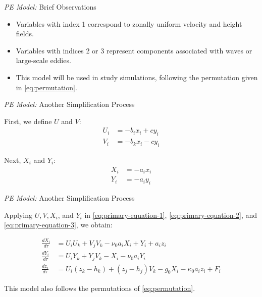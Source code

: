 
\begin{frame}{\textit{PE Model:} Brief Observations}
	
	\begin{itemize}
		\item Variables with index 1 correspond to zonally uniform velocity and height fields.
		      
		\item Variables with indices 2 or 3 represent components associated with waves or large-scale eddies.
		      
		\item This model will be used in study simulations, following the permutation given in \eqref{eq:permutation}.
	\end{itemize}
	
\end{frame}


\begin{frame}{\textit{PE Model:} Another Simplification Process}
	
	First, we define $U$ and $V$:
	\begin{align}
		U_i & = -b_ix_i + cy_i \\
		V_i & = -b_kx_i - cy_i 
	\end{align}
	
	Next, $X_i$ and $Y_i$:
	\begin{align}
		X_i & = -a_ix_i \\
		Y_i & = -a_iy_i 
	\end{align}
	
\end{frame}


\begin{frame}{\textit{PE Model:} Another Simplification Process}
	
	Applying $U, V, X_i$, and $Y_i$ in \eqref{eq:primary-equation-1}, \eqref{eq:primary-equation-2}, and \eqref{eq:primary-equation-3}, we obtain:
	
	\begin{align}
		\frac{dX_i}{d\tau} & = U_iU_k + V_jV_k - \nu_0a_iX_i + Y_i + a_iz_i \label{eq:simplified-equation-1}                    \\
		\frac{dY_i}{d\tau} & = U_iY_k + Y_jV_k - X_i - \nu_0a_iY_i \label{eq:simplified-equation-2}                             \\
		\frac{dz_i}{d\tau} & = U_i(z_k - h_k) + (z_j - h_j)V_k - g_0X_i - \kappa_0a_iz_i + F_i \label{eq:simplified-equation-3} 
	\end{align}
	
	This model also follows the permutations of \eqref{eq:permutation}.
	
\end{frame}

